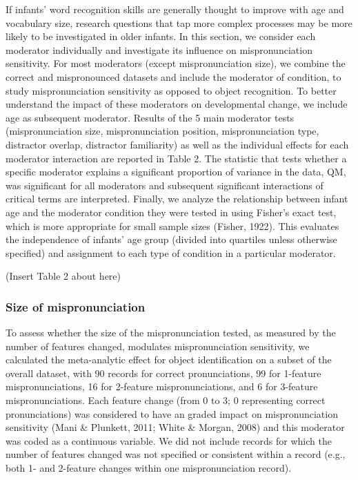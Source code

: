 \documentclass[
  man, noextraspace]{apa6}
\begin{document}
If infants' word recognition skills are generally thought to improve with age and vocabulary size, research questions that tap more complex processes may be more likely to be investigated in older infants. In this section, we consider each moderator individually and investigate its influence on mispronunciation sensitivity. For most moderators (except mispronunciation size), we combine the correct and mispronounced datasets and include the moderator of condition, to study mispronunciation sensitivity as opposed to object recognition. To better understand the impact of these moderators on developmental change, we include age as subsequent moderator. Results of the 5 main moderator tests (mispronunciation size, mispronunciation position, mispronunciation type, distractor overlap, distractor familiarity) as well as the individual effects for each moderator interaction are reported in Table 2. The statistic that tests whether a specific moderator explains a significant proportion of variance in the data, QM, was significant for all moderators and subsequent significant interactions of critical terms are interpreted. Finally, we analyze the relationship between infant age and the moderator condition they were tested in using Fisher's exact test, which is more appropriate for small sample sizes (Fisher, 1922). This evaluates the independence of infants' age group (divided into quartiles unless otherwise specified) and assignment to each type of condition in a particular moderator.

(Insert Table 2 about here)

\hypertarget{size-of-mispronunciation}{%
\subsubsection{Size of mispronunciation}\label{size-of-mispronunciation}}

To assess whether the size of the mispronunciation tested, as measured by the number of features changed, modulates mispronunciation sensitivity, we calculated the meta-analytic effect for object identification on a subset of the overall dataset, with 90 records for correct pronunciations, 99 for 1-feature mispronunciations, 16 for 2-feature mispronunciations, and 6 for 3-feature mispronunciations. Each feature change (from 0 to 3; 0 representing correct pronunciations) was considered to have an graded impact on mispronunciation sensitivity (Mani \& Plunkett, 2011; White \& Morgan, 2008) and this moderator was coded as a continuous variable. We did not include records for which the number of features changed was not specified or consistent within a record (e.g., both 1- and 2-feature changes within one mispronunciation record).
\end{document}
